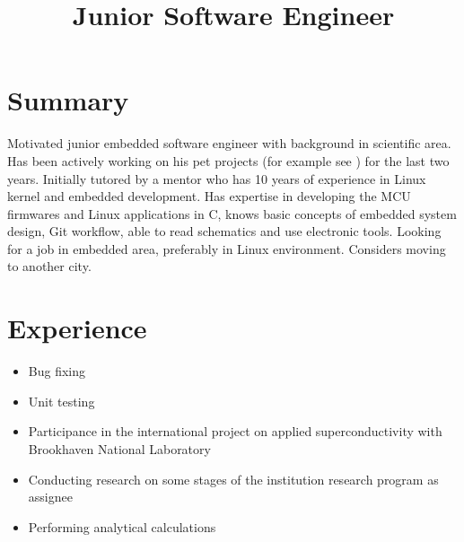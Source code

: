 \documentclass[11pt,a4paper]{moderncv}
\title{Junior Software Engineer}
\begin{document}
\renewcommand*{\bibliographyhead}[1]{}

\maketitle

\section{Summary}

Motivated junior embedded software engineer with background in scientific area.
Has been actively working on his pet projects (for example see \cite{a, b}) for the
last two years. Initially tutored by a mentor who has 10 years of experience in
Linux kernel and embedded development. Has expertise in developing the MCU
firmwares and Linux applications in C, knows basic concepts of embedded system
design, Git workflow, able to read schematics and use electronic tools. Looking
for a job in embedded area, preferably in Linux environment.
Considers moving to another city.


\section{Experience}
   {\begin{itemize}
     \item Bug fixing
     \item Unit testing
   \end{itemize}}
   {\begin{itemize}
     \item Participance in the international project on applied superconductivity with \newline{}
           Brookhaven National Laboratory
     \item Conducting research on some stages of the institution research program as \newline{}
           assignee
     \item Performing analytical calculations
   \end{itemize}}
\end{document}
